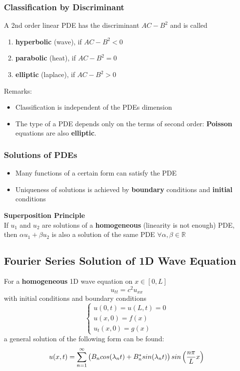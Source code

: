 \subsubsection*{Classification by Discriminant}
A 2nd order linear PDE has the discriminant $AC-B^2$ and is called
\begin{enumerate}
    \item \textbf{hyperbolic} (wave), if $AC-B^2<0$
    \item \textbf{parabolic} (heat), if $AC-B^2=0$
    \item \textbf{elliptic} (laplace), if $AC-B^2>0$
\end{enumerate}
\vspace{5pt}
Remarks:
\begin{itemize}
    \item Classification is independent of the PDEs dimension\vspace{5pt}
    \item The type of a PDE depends only on the terms of second order: \textbf{Poisson} equations are also \textbf{elliptic}.
\end{itemize}
%
%
\subsubsection{Solutions of PDEs}
\begin{itemize}
    \item Many functions of a certain form can satisfy the PDE
    \item Uniqueness of solutions is achieved by \textbf{boundary} conditions and \textbf{initial} conditions
\end{itemize}
\vspace{5pt}
\textbf{Superposition Principle}\\
If $u_{1}$ and $u_{2}$ are solutions of a \textbf{homogeneous} (linearity is not enough) PDE, then $\alpha u_{1} + \beta u_{2}$ is also a solution of the same PDE $\forall \alpha , \beta \in \mathbb{R}$
%
%
%
\subsection{Fourier Series Solution of 1D Wave Equation}
For a \textbf{homogeneous} 1D wave equation on $x\in[0,L]$
\[ u_{tt}=c^2u_{xx}\]
with initial conditions and boundary conditions
\[ \begin{cases} u(0,t)=u(L,t)=0\\ u(x,0)=f(x)\\ u_t(x,0)=g(x)\end{cases}\]
a general solution of the following form can be found:
\begin{equation}
    u(x,t)=\sum\limits_{n=1}^{\infty}\begin{pmatrix}
B_n cos(\lambda _n t)+B_n^* sin(\lambda_n t)
\end{pmatrix}sin\left(\frac{n \pi}{L}x \right)\label{eq:formel1}\vspace{-2pt}
\end{equation} 
%
%
